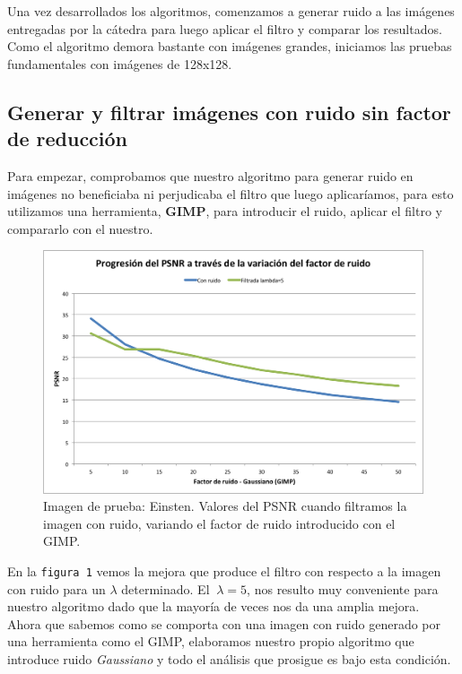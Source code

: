 \documentclass[a4paper]{article}
\begin{document}
Una vez desarrollados los algoritmos, comenzamos a generar ruido a las imágenes entregadas por la cátedra para luego aplicar el filtro y comparar los resultados. Como el algoritmo demora bastante con imágenes grandes, iniciamos las pruebas fundamentales con imágenes de 128x128. \vspace{1em}

\subsection{Generar y filtrar imágenes con ruido sin factor de reducción}

Para empezar, comprobamos que nuestro algoritmo para generar ruido en imágenes no beneficiaba ni perjudicaba el filtro que luego aplicaríamos, para esto utilizamos una herramienta, \textbf{GIMP}, para introducir el ruido, aplicar el filtro y compararlo con el nuestro.

\begin{figure}[H]
  \centering
  \includegraphics[scale=0.75]{graficos/PSNR_Einstein-GIMP.png}
  \caption{ Imagen de prueba: Einsten. Valores del PSNR cuando filtramos la imagen con ruido, variando el factor de ruido introducido con el GIMP.}
\end{figure}

En la \texttt{figura 1}  vemos la mejora que produce el filtro con respecto a la imagen con ruido para un $\lambda$ determinado. 
El $\ \lambda = 5$, nos resulto muy conveniente para nuestro algoritmo dado que la mayoría de veces nos da una amplia mejora. \\ 

Ahora que sabemos como se comporta con una imagen con ruido generado por una herramienta como el GIMP, elaboramos nuestro propio algoritmo que introduce ruido \textit{Gaussiano} y todo el análisis que prosigue es bajo esta condición.
\end{document}

